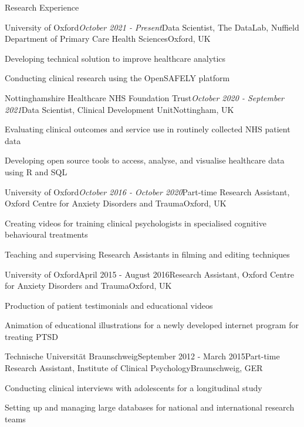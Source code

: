 \documentclass{resume} %
\begin{document}

\begin{rSection}{Research Experience}

\begin{rSubsection}{University of Oxford}{\em October 2021 - Present}{Data Scientist, The DataLab, Nuffield Department of Primary Care Health Sciences}{Oxford, UK}
\item Developing technical solution to improve healthcare analytics
\item Conducting clinical research using the OpenSAFELY platform
\end{rSubsection}

\begin{rSubsection}{Nottinghamshire Healthcare NHS Foundation Trust}{\em October 2020 - September 2021}{Data Scientist, Clinical Development Unit}{Nottingham, UK}
\item Evaluating clinical outcomes and service use in routinely collected NHS patient data
\item Developing open source tools to access, analyse, and visualise healthcare data using R and SQL
\end{rSubsection}

\begin{rSubsection}{University of Oxford}{\em October 2016 - October 2020}{Part-time Research Assistant, Oxford Centre for Anxiety Disorders and Trauma}{Oxford, UK}
\item Creating videos for training clinical psychologists in specialised cognitive behavioural treatments
\item Teaching and supervising Research Assistants in filming and editing techniques
\end{rSubsection}

\begin{rSubsection}{University of Oxford}{April 2015 - August 2016}{Research Assistant, Oxford Centre for Anxiety Disorders and Trauma}{Oxford, UK}
\item Production of patient testimonials and educational videos
\item Animation of educational illustrations for a newly developed internet program for treating PTSD
\end{rSubsection}

\begin{rSubsection}{Technische Universit{\"a}t Braunschweig}{September 2012 - March 2015}{Part-time Research Assistant, Institute of Clinical Psychology}{Braunschweig, GER}
\item Conducting clinical interviews with adolescents for a longitudinal study
\item Setting up and managing large databases for national and international research teams
\end{rSubsection}

\end{rSection}
\end{document}
